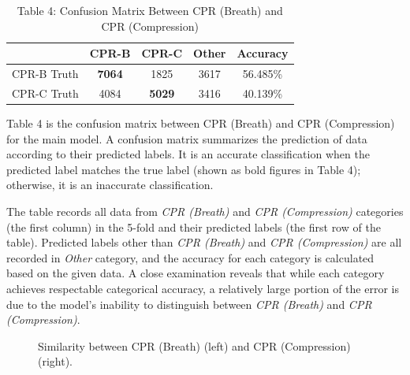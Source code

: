 \documentclass[letterpaper, 10 pt, conference]{ieeeconf}  %
\begin{document}
\begin{table}[!htb]
\begin{center}
 \begin{tabular}{||l c c c c ||} 
 \hline
 & CPR-B & CPR-C & Other & Accuracy \\ [0.5ex] 
 \hline\hline
CPR-B Truth & \textbf{7064} & 1825 & 3617 & 56.485\%\\ 
 \hline
CPR-C Truth & 4084 & \textbf{5029} &  3416 & 40.139\% \\ 
 
 \hline
\end{tabular}
\caption{Table 4:  Confusion Matrix Between CPR (Breath) and CPR (Compression)} 
\end{center}
\end{table}

Table 4 is the  confusion matrix between CPR (Breath) and CPR (Compression) for the main model. A confusion matrix summarizes the prediction of data according to their predicted labels.  It is an accurate classification when the predicted label matches the true label (shown as bold figures in Table 4); otherwise, it is an inaccurate classification. 

The table records all data from \textit{CPR (Breath)} and \textit{CPR (Compression)} categories (the first column) in the 5-fold and their predicted labels (the first row of the table). Predicted labels other than \textit{CPR (Breath)} and \textit{CPR (Compression)} are all recorded in \textit{Other} category, and the accuracy for each category is calculated based on the given data.  A close examination reveals that while each category achieves respectable categorical accuracy, a relatively large portion of the error is due to the model's inability to distinguish between \textit{CPR (Breath)} and \textit{CPR (Compression)}. 

 \begin{figure}[!htb]
        \caption{\label{fig: CPR Transition}  Similarity between CPR (Breath) (left) and CPR (Compression) (right). }
      \end{figure}
\end{document}
